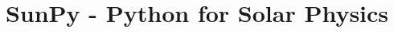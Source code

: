 \documentclass[12pt]{iopart}
\begin{document}
\title{SunPy - Python for Solar Physics}





\maketitle


















{}
\end{document}
